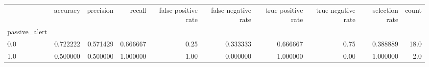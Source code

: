 \begin{tabular}{lrrrrrrrrr}
\toprule
{} &  accuracy &  precision &    recall &  false positive rate &  false negative rate &  true positive rate &  true negative rate &  selection rate &  count \\
passive\_alert &           &            &           &                      &                      &                     &                     &                 &        \\
\midrule
0.0           &  0.722222 &   0.571429 &  0.666667 &                 0.25 &             0.333333 &            0.666667 &                0.75 &        0.388889 &   18.0 \\
1.0           &  0.500000 &   0.500000 &  1.000000 &                 1.00 &             0.000000 &            1.000000 &                0.00 &        1.000000 &    2.0 \\
\bottomrule
\end{tabular}
